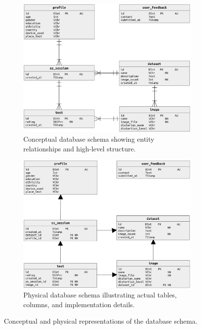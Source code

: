 \begin{figure}
    \centering
    \begin{subfigure}{0.8\textwidth}
        \includegraphics[width=\textwidth]{images/db_conceptual.png}
        \caption{Conceptual database schema showing entity relationships and high-level structure.}\label{fig:db_conceptual}
    \end{subfigure}
    \vfill
    \begin{subfigure}{0.8\textwidth}
        \includegraphics[width=\textwidth]{images/db_physical.png}
        \caption{Physical database schema illustrating actual tables, columns, and implementation details.}\label{fig:db_physical}
    \end{subfigure}
    \caption{Conceptual and physical representations of the database schema.}\label{fig:db_schemas}
\end{figure}


